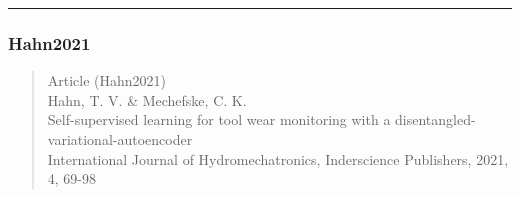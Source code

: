 \documentclass[
  letterpaper,
  DIV=11,
  numbers=noendperiod]{scrartcl}
\begin{document}
\begin{center}\rule{0.5\linewidth}{0.5pt}\end{center}

\subsubsection{Hahn2021}\label{hahn2021}

\begin{quote}
Article (Hahn2021)\\
Hahn, T. V. \& Mechefske, C. K.\\
Self-supervised learning for tool wear monitoring with a
disentangled-variational-autoencoder\\
International Journal of Hydromechatronics, Inderscience Publishers,
2021, 4, 69-98
\end{quote}
\end{document}

